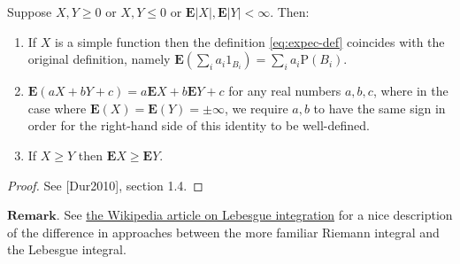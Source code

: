 \begin{thm}
Suppose $X,Y\ge 0$ or $X,Y\le 0$ or
$\mathbf{E} |X|, \mathbf{E}|Y|<\infty$. Then:

\begin{enumerate}[label=\arabic*.]
\item If $X$ is a simple function then the definition
\eqref{eq:expec-def} coincides with the original
definition, namely
$\mathbf{E}(\sum_i a_i 1_{B_i}) = \sum_i a_i
\mathrm{P}(B_i)$.

\item $\mathbf{E}(aX+bY+c)=a\mathbf{E} X + b\mathbf{E} Y+c$
for any real numbers $a,b,c$, where in the case where
$\mathbf{E}(X)=\mathbf{E}(Y) = \pm \infty$, we
require $a,b$ to have the same sign in order for the
right-hand side of this identity to be well-defined.

\item If $X\ge Y$ then $\mathbf{E} X\ge \mathbf{E} Y$.
\end{enumerate}

\end{thm}

\begin{proof}
See [Dur2010], section 1.4.
\end{proof}

\noindent $\textbf{Remark.}$ See \href{http://en.wikipedia.org/wiki/Lebesgue_integration\#Intuitive_interpretation}{the Wikipedia article on
Lebesgue
integration}
for a nice description of the difference in approaches
between the more familiar Riemann integral and the
Lebesgue integral.
